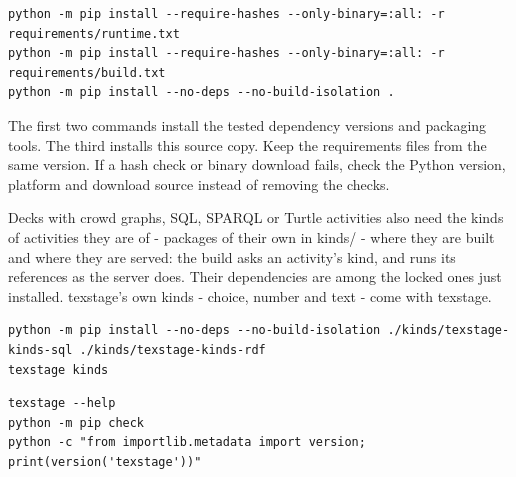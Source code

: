 \documentclass[a4paper,11pt]{article}
\begin{document}
\par\noindent\begin{minipage}{\linewidth}
\begin{Verbatim}
python -m pip install --require-hashes --only-binary=:all: -r requirements/runtime.txt
python -m pip install --require-hashes --only-binary=:all: -r requirements/build.txt
python -m pip install --no-deps --no-build-isolation .
\end{Verbatim}
\end{minipage}\par\smallskip

The first two commands install the tested dependency versions and packaging tools.\allowbreak{} The third installs this source copy.\allowbreak{} Keep the requirements files from the same version.\allowbreak{} If a hash check or binary download fails, check the Python version, platform and download source instead of removing the checks.\par

Decks with crowd graphs, SQL, SPARQL or Turtle activities also need the kinds of activities they are of -\allowbreak{} packages of their own in kinds/\allowbreak{} -\allowbreak{} where they are built and where they are served: the build asks an activity's kind, and runs its references as the server does.\allowbreak{} Their dependencies are among the locked ones just installed.\allowbreak{} texstage's own kinds -\allowbreak{} choice, number and text -\allowbreak{} come with texstage.\par

\par\noindent\begin{minipage}{\linewidth}
\begin{Verbatim}
python -m pip install --no-deps --no-build-isolation ./kinds/texstage-kinds-sql ./kinds/texstage-kinds-rdf
texstage kinds
\end{Verbatim}
\end{minipage}\par\smallskip

\par\noindent\begin{minipage}{\linewidth}
\begin{Verbatim}
texstage --help
python -m pip check
python -c "from importlib.metadata import version; print(version('texstage'))"
\end{Verbatim}
\end{minipage}\par\smallskip
\end{document}
